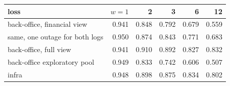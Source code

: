 \begin{tabular}{lrrrrr}
\toprule
loss & $w=1$ & 2 & 3 & 6 & 12 \\
\midrule
back-office, financial view & 0.941 & 0.848 & 0.792 & 0.679 & 0.559 \\
same, one outage for both logs & 0.950 & 0.874 & 0.843 & 0.771 & 0.683 \\
back-office, full view & 0.941 & 0.910 & 0.892 & 0.827 & 0.832 \\
back-office exploratory pool & 0.949 & 0.833 & 0.742 & 0.606 & 0.507 \\
infra & 0.948 & 0.898 & 0.875 & 0.834 & 0.802 \\
\bottomrule
\end{tabular}
\par{}
